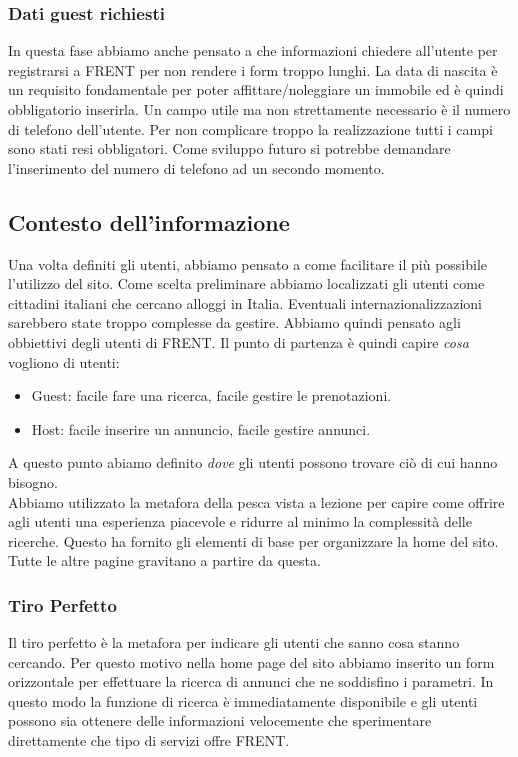 \documentclass[1_relazione.tex]{subfiles}
\begin{document}
\subsubsection{Dati guest richiesti}
In questa fase abbiamo anche pensato a che informazioni chiedere all'utente per registrarsi a FRENT per non rendere i form troppo lunghi. La data di nascita è un requisito fondamentale per poter affittare/noleggiare un immobile ed è quindi obbligatorio inserirla. Un campo utile ma non strettamente necessario è il numero di telefono dell'utente. Per non complicare troppo la realizzazione tutti i campi sono stati resi obbligatori. Come sviluppo futuro si potrebbe demandare l'inserimento del numero di telefono ad un secondo momento.

\subsection{Contesto dell'informazione }
Una volta definiti gli utenti, abbiamo pensato a come facilitare il più possibile l'utilizzo del sito. Come scelta preliminare abbiamo localizzati gli utenti come cittadini italiani che cercano alloggi in Italia. Eventuali internazionalizzazioni sarebbero state troppo complesse da gestire. Abbiamo quindi pensato agli obbiettivi degli utenti di FRENT.  Il punto di partenza è quindi capire \textit{cosa} vogliono di utenti:

\begin{itemize}
\item Guest: facile fare una ricerca, facile gestire le prenotazioni.
\item Host: facile inserire un annuncio, facile gestire annunci.
\end{itemize}

A questo punto abiamo definito \textit{dove} gli utenti possono trovare ciò di cui hanno bisogno.\\ Abbiamo utilizzato la metafora della pesca vista a lezione per capire come offrire agli utenti una esperienza piacevole e ridurre al minimo la complessità delle ricerche. Questo ha fornito gli elementi di base per organizzare la home del sito. Tutte le altre pagine gravitano a partire da questa.

\subsubsection{Tiro Perfetto} 
Il tiro perfetto è la metafora per indicare gli utenti che sanno cosa stanno cercando. Per questo motivo nella home page del sito abbiamo inserito un form orizzontale per effettuare la ricerca di annunci che ne soddisfino i parametri. In questo modo la funzione di ricerca è immediatamente disponibile e gli utenti possono sia ottenere delle informazioni velocemente che sperimentare direttamente che tipo di servizi offre FRENT.
 
\end{document}
